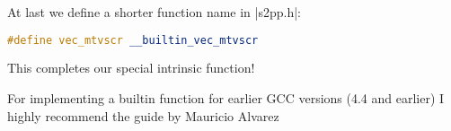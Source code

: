 At last we define a shorter function name in |s2pp.h|:
\begin{lstlisting}[language=C++,basicstyle=\ttfamily\scriptsize,keywordstyle=\color{red}] 
#define vec_mtvscr __builtin_vec_mtvscr
\end{lstlisting}
This completes our special intrinsic function!

For implementing a builtin function for earlier GCC versions (4.4 and earlier) I highly recommend the guide by Mauricio Alvarez  
